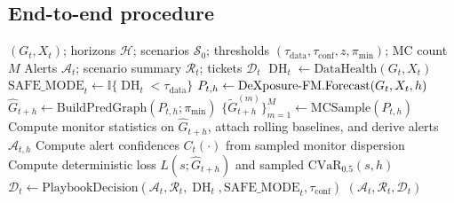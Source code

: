 \subsection{End-to-end procedure}

\begin{algorithm}[h]
\caption{\sysname{}: one decision epoch.}
\label{alg:agent_loop}
\small
\begin{algorithmic}[1]
\Require $(G_t,X_t)$; horizons $\mathcal{H}$; scenarios
$\mathcal{S}_0$; thresholds
$(\tau_{\mathrm{data}},\tau_{\mathrm{conf}},z,\pi_{\min})$; MC count $M$
\Ensure Alerts $\mathcal{A}_t$; scenario summary $\mathcal{R}_t$;
tickets $\mathcal{D}_t$
\State $\operatorname{DH}_t\gets\mathrm{DataHealth}(G_t,X_t)$
\State $\mathrm{SAFE\_MODE}_t\gets
       \mathbb{I}\{\operatorname{DH}_t<\tau_{\mathrm{data}}\}$
  \State $P_{t,h}\gets\text{DeXposure-FM.Forecast}(G_t,X_t,h)$
  \State $\widehat{G}_{t+h}\gets
         \mathrm{BuildPredGraph}(P_{t,h};\pi_{\min})$
  \State $\{\widetilde{G}^{(m)}_{t+h}\}_{m=1}^M\gets
         \mathrm{MCSample}(P_{t,h})$
  \State Compute monitor statistics on $\widehat{G}_{t+h}$, attach rolling
         baselines, and derive alerts $\mathcal{A}_{t,h}$
  \State Compute alert confidences $C_t(\cdot)$ from sampled monitor
         dispersion
    \State Compute deterministic loss $L(s;\widehat{G}_{t+h})$ and sampled
           $\mathrm{CVaR}_{0.5}(s,h)$
  \EndFor
\EndFor
\State $\mathcal{D}_t\gets
       \mathrm{PlaybookDecision}(\mathcal{A}_t,\mathcal{R}_t,
       \operatorname{DH}_t,\mathrm{SAFE\_MODE}_t,\tau_{\mathrm{conf}})$
\State \Return $(\mathcal{A}_t,\mathcal{R}_t,\mathcal{D}_t)$
\end{algorithmic}
\end{algorithm}
